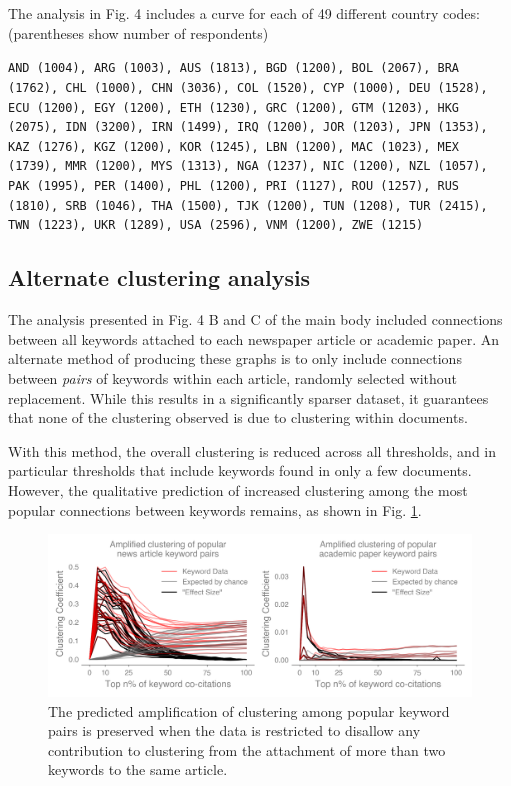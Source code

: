 \documentclass{article}
\begin{document}
The analysis in Fig. 4 includes a curve for each of 49 different country codes: (parentheses show number of respondents)

\noindent
\texttt{AND (1004), ARG (1003), AUS (1813), BGD (1200), BOL (2067), BRA (1762), CHL (1000), CHN (3036), COL (1520), CYP (1000), DEU (1528), ECU (1200), EGY (1200), ETH (1230), GRC (1200), GTM (1203), HKG (2075), IDN (3200), IRN (1499), IRQ (1200), JOR (1203), JPN (1353), KAZ (1276), KGZ (1200), KOR (1245), LBN (1200), MAC (1023), MEX (1739), MMR (1200), MYS (1313), NGA (1237), NIC (1200), NZL (1057), PAK (1995), PER (1400), PHL (1200), PRI (1127), ROU (1257), RUS (1810), SRB (1046), THA (1500), TJK (1200), TUN (1208), TUR (2415), TWN (1223), UKR (1289), USA (2596), VNM (1200), ZWE (1215)}

\subsection{Alternate clustering analysis}
The analysis presented in Fig. 4 B and C of the main body included connections between all keywords attached to each newspaper article or academic paper. An alternate method of producing these graphs is to only include connections between \textit{pairs} of keywords within each article, randomly selected without replacement. While this results in a significantly sparser dataset, it guarantees that none of the clustering observed is due to clustering within documents. 

With this method, the overall clustering is reduced across all thresholds, and in particular thresholds that include keywords found in only a few documents. However, the qualitative prediction of increased clustering among the most popular connections between keywords remains, as shown in Fig. \ref{fig:pairwise_clustering}.

\begin{figure}[H]
\centering
\includegraphics[width=0.8\columnwidth]{Pairwise_Clustering.png}
\caption{The predicted amplification of clustering among popular keyword pairs is preserved when the data is restricted to disallow any contribution to clustering from the attachment of more than two keywords to the same article.}
\label{fig:pairwise_clustering}
\end{figure}
\end{document}
